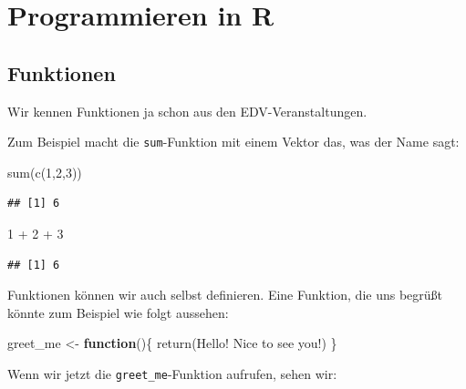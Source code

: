 \documentclass[
]{book}
\newenvironment{Shaded}{\begin{snugshade}}{\end{snugshade}}
\newcommand{\ControlFlowTok}[1]{\textcolor[rgb]{0.13,0.29,0.53}{\textbf{#1}}}
\newcommand{\DecValTok}[1]{\textcolor[rgb]{0.00,0.00,0.81}{#1}}
\newcommand{\FunctionTok}[1]{\textcolor[rgb]{0.00,0.00,0.00}{#1}}
\newcommand{\NormalTok}[1]{#1}
\newcommand{\OtherTok}[1]{\textcolor[rgb]{0.56,0.35,0.01}{#1}}
\newcommand{\SpecialCharTok}[1]{\textcolor[rgb]{0.00,0.00,0.00}{#1}}
\newcommand{\StringTok}[1]{\textcolor[rgb]{0.31,0.60,0.02}{#1}}
\begin{document}
\hypertarget{part-programmieren-in-r}{%
\part{Programmieren in R}\label{part-programmieren-in-r}}

\hypertarget{funktionen}{%
\chapter{Funktionen}\label{funktionen}}

Wir kennen Funktionen ja schon aus den EDV-Veranstaltungen.

Zum Beispiel macht die \texttt{sum}-Funktion mit einem Vektor das, was der Name sagt:

\begin{Shaded}
\begin{Highlighting}[]
\FunctionTok{sum}\NormalTok{(}\FunctionTok{c}\NormalTok{(}\DecValTok{1}\NormalTok{,}\DecValTok{2}\NormalTok{,}\DecValTok{3}\NormalTok{))}
\end{Highlighting}
\end{Shaded}

\begin{verbatim}
## [1] 6
\end{verbatim}

\begin{Shaded}
\begin{Highlighting}[]
\DecValTok{1} \SpecialCharTok{+} \DecValTok{2} \SpecialCharTok{+} \DecValTok{3}
\end{Highlighting}
\end{Shaded}

\begin{verbatim}
## [1] 6
\end{verbatim}

Funktionen können wir auch selbst definieren. Eine Funktion, die uns begrüßt könnte zum Beispiel wie folgt aussehen:

\begin{Shaded}
\begin{Highlighting}[]
\NormalTok{greet\_me }\OtherTok{\textless{}{-}} \ControlFlowTok{function}\NormalTok{()\{}
  \FunctionTok{return}\NormalTok{(}\StringTok{\textquotesingle{}Hello! Nice to see you!\textquotesingle{}}\NormalTok{)}
\NormalTok{\}}
\end{Highlighting}
\end{Shaded}

Wenn wir jetzt die \texttt{greet\_me}-Funktion aufrufen, sehen wir:
\end{document}
